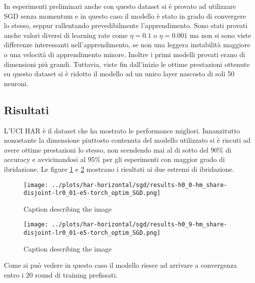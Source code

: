 In esperimenti preliminari anche con questo dataset si è provato ad 
utilizzare SGD senza momentum e in questo caso il modello è stato in 
grado di convergere lo stesso, seppur rallentando prevedibilmente 
l'apprendimento. Sono stati provati anche valori diversi di learning 
rate come \(\eta = 0.1\) o \(\eta = 0.001\) ma non si sono viste 
differenze interessanti nell'apprendimento, se non una leggera 
instabilità maggiore o una velocità di apprendimento minore.
Inoltre i primi modelli provati erano di dimensioni più grandi. 
Tuttavia, viste fin dall'inizio le ottime prestazioni ottenute su 
questo dataset si è ridotto il modello ad un unico layer nascosto di 
soli 50 neuroni.


\subsection{Risultati}
L'UCI HAR è il dataset che ha mostrato le performance migliori.
Innanzitutto nonostante la dimensione piuttosto contenuta del modello
utilizzato si è riscuti ad avere ottime prestazioni lo stesso, non 
scendendo mai al di sotto del 90\% di accuracy e avvicinandosi al 
95\% per gli esperimenti con maggior grado di ibridazione. Le 
figure \ref{fig:hars0sgd} e \ref{fig:hars9sgd} mostrano i risultati 
ai due estremi di ibridazione.
\begin{figure}[htbp]  %
    \centering
    \texttt{[image: ../plots/har-horizontal/sgd/results-h0\_0-hm\_share-disjoint-lr0\_01-e5-torch\_optim\_SGD.png]}
    \caption{Caption describing the image}
    \label{fig:hars0sgd}
\end{figure}
\begin{figure}[htbp]  %
    \centering
    \texttt{[image: ../plots/har-horizontal/sgd/results-h0\_9-hm\_share-disjoint-lr0\_01-e5-torch\_optim\_SGD.png]}
    \caption{Caption describing the image}
    \label{fig:hars9sgd}
\end{figure}

Come si può vedere in questo caso il modello riesce ad arrivare a 
convergenza entro i 20 round di training prefissati.

